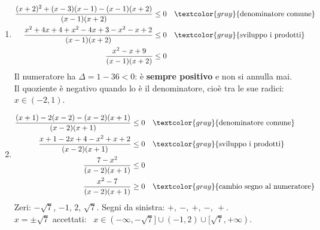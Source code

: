 \begin{question}[ID=2.4, subtitle={Disequazioni frazionarie con più fattori}, difficulty=difficile, tags={disequazioni frazionarie}]
\begin{explanation}
\begin{enumerate}
    \item \[\begin{aligned}
    \dfrac{(x+2)^2+(x-3)(x-1)-(x-1)(x+2)}{(x-1)(x+2)} &\leq 0 && \textcolor{gray}{\text{denominatore comune}}\\
    \dfrac{x^2+4x+4+x^2-4x+3-x^2-x+2}{(x-1)(x+2)} &\leq 0 && \textcolor{gray}{\text{sviluppo i prodotti}}\\
    \dfrac{x^2-x+9}{(x-1)(x+2)} &\leq 0
    \end{aligned}\]
    Il numeratore ha $\Delta=1-36<0$: è \textbf{sempre positivo} e non si annulla mai. \\
    Il quoziente è negativo quando lo è il denominatore, cioè tra le sue radici: \ $x\in(-2,1)$.
    \item \[\begin{aligned}
    \dfrac{(x+1)-2(x-2)-(x-2)(x+1)}{(x-2)(x+1)} &\leq 0 && \textcolor{gray}{\text{denominatore comune}}\\
    \dfrac{x+1-2x+4-x^2+x+2}{(x-2)(x+1)} &\leq 0 && \textcolor{gray}{\text{sviluppo i prodotti}}\\
    \dfrac{7-x^2}{(x-2)(x+1)} &\leq 0\\
    \dfrac{x^2-7}{(x-2)(x+1)} &\geq 0 && \textcolor{gray}{\text{cambio segno al numeratore}}
    \end{aligned}\]
    Zeri: $-\sqrt7$, $-1$, $2$, $\sqrt7$. Segni da sinistra: $+,\ -,\ +,\ -,\ +$. \\
    $x=\pm\sqrt7$ accettati: \ $x\in(-\infty,-\sqrt7]\cup(-1,2)\cup[\sqrt7,+\infty)$.
\end{enumerate}
\end{explanation}
\end{question}